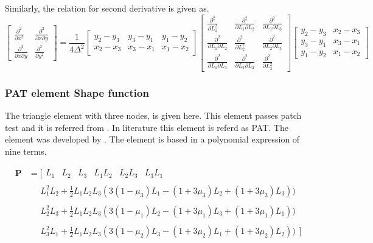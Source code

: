 \documentclass[main.tex]{subfiles}
\begin{document}
Similarly, the relation for second derivative is given as.
\begin{equation}
\begin{bmatrix}
 \frac{\partial ^ 2}{\partial x ^2}   &  \frac{\partial ^ 2}{\partial x \partial y }   
 \\
\frac{\partial ^ 2}{\partial x \partial y } &  \frac{\partial ^ 2}{\partial y ^2} 
\end{bmatrix} 
=
\frac{1}{4 \Delta ^2}
\begin{bmatrix}
y_2-y_3 & y_3-y_1 & y_1-y_2 \\
x_2-x_3 & x_3-x_1 & x_1-x_2
\end{bmatrix} 
\begin{bmatrix}
 \frac{\partial^2}{\partial L_1 ^2} &  \frac{\partial^2}{\partial L_1 \partial L_2} &  \frac{\partial^2}{\partial L_1 \partial L_3}  \\
 \frac{\partial^2}{\partial L_1 \partial L_2} & \frac{\partial^2}{\partial L_2 ^2} &   \frac{\partial^2}{\partial L_2 \partial L_3}  \\
 \frac{\partial^2}{\partial L_1 \partial L_3} &   \frac{\partial^2}{\partial L_3 \partial L_2} & \frac{\partial^2}{\partial L_3 ^2}   
\end{bmatrix} 
\begin{bmatrix}
y_2-y_3 & x_2-x_3  \\
y_3-y_1 &  x_3-x_1  \\
y_1-y_2 &  x_1-x_2
\end{bmatrix} 
\end{equation}




\subsubsection{PAT element Shape function}
The triangle element with three nodes, is given here. This element passes patch test and it is referred from \cite{ZIENKIE_BOOK_STRUCT_CH11}. In literature this element is referd as PAT. The element was developed by \cite{specht}. The element is based in a polynomial expression of nine terms.
 

\begin{equation}\label{eq:poly}
\begin{split}
\textbf{P} & = [
\begin{matrix}
L_1
&
L_2
&
L_3
&
L_1 L_2
&
L_2 L_3
&
L_3 L_1
\end{matrix} \\
& \quad
\begin{matrix}
L_1^2L_2+\frac{1}{2}L_1L_2L_3(3(1-\mu_3)L_1-(1+3\mu_3)L_2+(1+3\mu_3)L_3) )
\end{matrix}\\
& \quad
\begin{matrix}
L_2^2L_3+\frac{1}{2}L_1L_2L_3(3(1-\mu_1)L_2-(1+3\mu_1)L_3+(1+3\mu_1)L_1) )
\end{matrix}\\
& \quad
\begin{matrix}
L_3^2L_1+\frac{1}{2}L_1L_2L_3(3(1-\mu_2)L_3-(1+3\mu_2)L_1+(1+3\mu_2)L_2) )
\end{matrix} ]
\end{split}
\end{equation}
\end{document}
